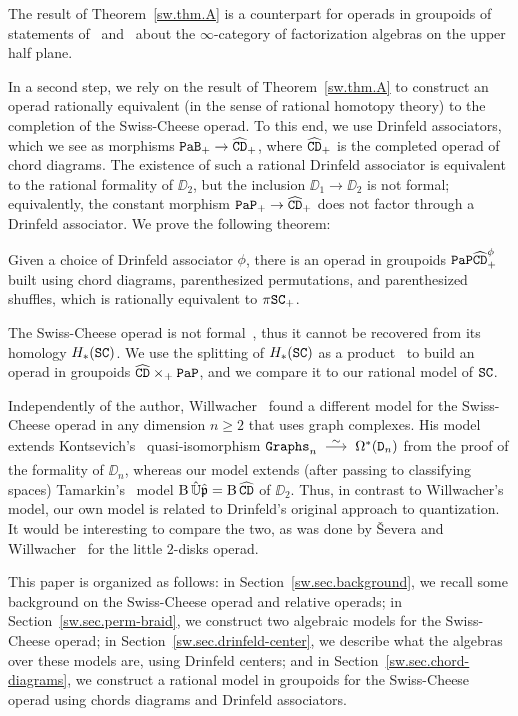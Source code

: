 The result of Theorem~\ref{sw.thm.A} is a counterpart for operads in groupoids of statements of~\cite[Proposition 31]{Ginot2015} and~\cite[Example 2.13]{AyalaFrancisTanaka2017} about the $\infty$-category of factorization algebras on the upper half plane.

In a second step, we rely on the result of Theorem~\ref{sw.thm.A} to construct an operad rationally equivalent (in the sense of rational homotopy theory) to the completion of the Swiss-Cheese operad.
To this end, we use Drinfeld associators, which we see as morphisms $\mathtt{PaB}_{+} \to \widehat{\mathtt{CD}}_{+}$, where $\widehat{\mathtt{CD}}_{+}$ is the completed operad of chord diagrams.
The existence of such a rational Drinfeld associator is equivalent to the rational formality of $\DD_{2}$, but the inclusion $\DD_{1} \to \DD_{2}$ is not formal; equivalently, the constant morphism $\mathtt{PaP}_{+} \to \widehat{\mathtt{CD}}_{+}$ does not factor through a Drinfeld associator.
We prove the following theorem:
\begin{theoremintro} \label{sw.thm.B}
  Given a choice of Drinfeld associator $\phi$, there is an operad in groupoids $\mathtt{PaP}\widehat{\mathtt{CD}}_{+}^{\phi}$ built using chord diagrams, parenthesized permutations, and parenthesized shuffles, which is rationally equivalent to $\pi \mathtt{SC}_{+}$.
\end{theoremintro}

The Swiss-Cheese operad is not formal~\cite{Livernet2015}, thus it cannot be recovered from its homology $H_{*}(\mathtt{SC})$.
We use the splitting of $H_{*}(\mathtt{SC})$ as a product~\cite{Voronov1999} to build an operad in groupoids $\widehat{\mathtt{CD}} \times_{+} \mathtt{PaP}$, and we compare it to our rational model of $\mathtt{SC}$.

Independently of the author, Willwacher~\cite{Willwacher2015a} found a different model for the Swiss-Cheese operad in any dimension $n \ge 2$ that uses graph complexes.
His model extends Kontsevich's~\cite{Kontsevich1999} quasi-isomorphism $\Graphs_{n} \qiso \Omega^{*}(\DD_{n})$ from the proof of the formality of $\DD_{n}$, whereas our model extends (after passing to classifying spaces) Tamarkin's~\cite{Tamarkin2003} model $\operatorname{B} \hat{\mathbb{U}} \hat{\mathfrak{p}} = \operatorname{B} \widehat{\mathtt{CD}}$ of $\DD_{2}$.
Thus, in contrast to Willwacher's model, our own model is related to Drinfeld's original approach to quantization.
It would be interesting to compare the two, as was done by Ševera and Willwacher~\cite{SeveraWillwacher2011} for the little $2$-disks operad.

This paper is organized as follows: in Section~\ref{sw.sec.background}, we recall some background on the Swiss-Cheese operad and relative operads; in Section~\ref{sw.sec.perm-braid}, we construct two algebraic models for the Swiss-Cheese operad; in Section~\ref{sw.sec.drinfeld-center}, we describe what the algebras over these models are, using Drinfeld centers; and in Section~\ref{sw.sec.chord-diagrams}, we construct a rational model in groupoids for the Swiss-Cheese operad using chords diagrams and Drinfeld associators.

